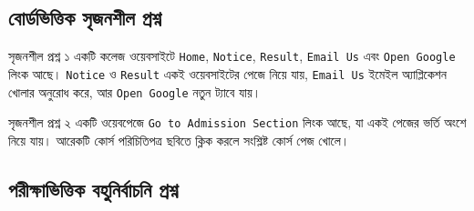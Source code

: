 \subsection{বোর্ডভিত্তিক সৃজনশীল প্রশ্ন}

\begin{boardbox}{সৃজনশীল প্রশ্ন ১}
একটি কলেজ ওয়েবসাইটে \texttt{Home}, \texttt{Notice}, \texttt{Result}, \texttt{Email Us} এবং \texttt{Open Google} লিংক আছে। \texttt{Notice} ও \texttt{Result} একই ওয়েবসাইটের পেজে নিয়ে যায়, \texttt{Email Us} ইমেইল অ্যাপ্লিকেশন খোলার অনুরোধ করে, আর \texttt{Open Google} নতুন ট্যাবে যায়।
\end{boardbox}



\begin{boardbox}{সৃজনশীল প্রশ্ন ২}
একটি ওয়েবপেজে \texttt{Go to Admission Section} লিংক আছে, যা একই পেজের ভর্তি অংশে নিয়ে যায়। আরেকটি কোর্স পরিচিতিপত্র ছবিতে ক্লিক করলে সংশ্লিষ্ট কোর্স পেজ খোলে।
\end{boardbox}



\subsection{পরীক্ষাভিত্তিক বহুনির্বাচনি প্রশ্ন}

